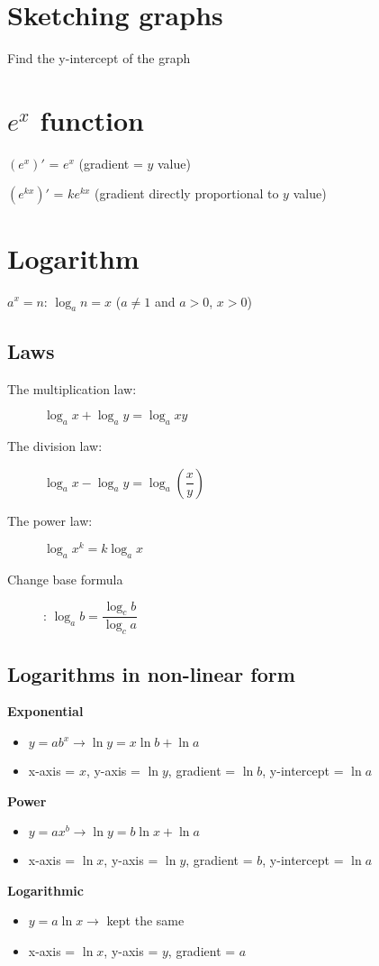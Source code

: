 \section{Sketching graphs}
Find the y-intercept of the graph

\section{$e^x$ function}
\begin{description}
    \item $(e^x)'$ = $e^x$ (gradient = $y$ value)
    \item $(e^{kx})'$ = $ke^{kx}$ (gradient directly proportional to $y$ value)
\end{description}

\section{Logarithm}
$a^x = n$: $\log_a n = x$ ($a\neq1$ and $a>0$, $x>0$)
\subsection{Laws}
\begin{description}
    \item[The multiplication law:] $\log_a x + \log_a y = \log_a xy$
    \item[The division law:] $\log_a x - \log_a y = \log_a\left(\dfrac{x}{y}\right)$
    \item[The power law:] $\log_a x^k = k\log_a x$
    \item[Change base formula]: $\log_a b = \dfrac{\log_c b}{\log_c a}$
\end{description}

\subsection{Logarithms in non-linear form}
\textbf{Exponential}
\begin{itemize}
    \item $y=ab^x\rightarrow\ln y = x\ln b + \ln a$
    \item x-axis = $x$, y-axis = $\ln y$, gradient = $\ln b$, y-intercept = $\ln a$
\end{itemize}
\textbf{Power}
\begin{itemize}
    \item $y=ax^b\rightarrow\ln y = b\ln x + \ln a$
    \item x-axis = $\ln x$, y-axis = $\ln y$, gradient = $b$, y-intercept = $\ln a$
\end{itemize}
\textbf{Logarithmic}
\begin{itemize}
    \item $y=a\ln x\rightarrow$ kept the same
    \item x-axis = $\ln x$, y-axis = $y$, gradient = $a$
\end{itemize}